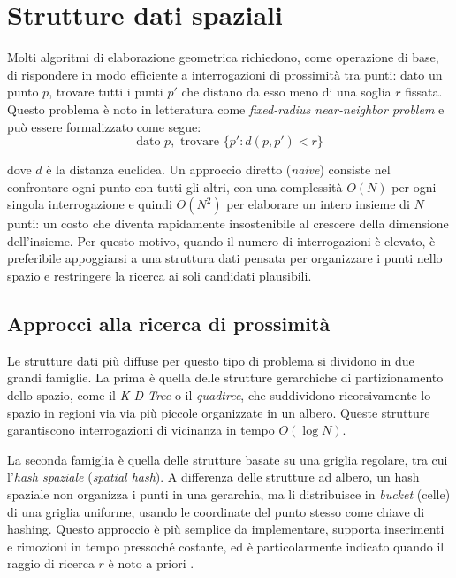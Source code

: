\section{Strutture dati spaziali}
\label{sec:strutture_dati_spaziali}

Molti algoritmi di elaborazione geometrica richiedono, come operazione di base, di rispondere in modo efficiente a interrogazioni di prossimità tra punti: dato un punto $p$, trovare tutti i punti $p'$ che distano da esso meno di una soglia $r$ fissata. Questo problema è noto in letteratura come \emph{fixed-radius near-neighbor problem} e può essere formalizzato come segue:
\[
\text{dato } p, \text{ trovare } \{p' : d(p, p') < r\}
\]

dove $d$ è la distanza euclidea. Un approccio diretto (\emph{naive}) consiste nel confrontare ogni punto con tutti gli altri, con una complessità $O(N)$ per ogni singola interrogazione e quindi $O(N^2)$ per elaborare un intero insieme di $N$ punti: un costo che diventa rapidamente insostenibile al crescere della dimensione dell'insieme. Per questo motivo, quando il numero di interrogazioni è elevato, è preferibile appoggiarsi a una struttura dati pensata per organizzare i punti nello spazio e restringere la ricerca ai soli candidati plausibili.

\subsection{Approcci alla ricerca di prossimità}

Le strutture dati più diffuse per questo tipo di problema si dividono in due grandi famiglie. La prima è quella delle strutture gerarchiche di partizionamento dello spazio, come il \emph{K-D Tree} o il \emph{quadtree}, che suddividono ricorsivamente lo spazio in regioni via via più piccole organizzate in un albero. Queste strutture garantiscono interrogazioni di vicinanza in tempo $O(\log N)$.

La seconda famiglia è quella delle strutture basate su una griglia regolare, tra cui l'\emph{hash spaziale} (\emph{spatial hash}). A differenza delle strutture ad albero, un hash spaziale non organizza i punti in una gerarchia, ma li distribuisce in \emph{bucket} (celle) di una griglia uniforme, usando le coordinate del punto stesso come chiave di hashing. Questo approccio è più semplice da implementare, supporta inserimenti e rimozioni in tempo pressoché costante, ed è particolarmente indicato quando il raggio di ricerca $r$ è noto a priori \cite{autoware_spatial_hash}.

